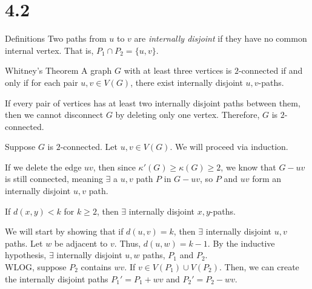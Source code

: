 \documentclass[10pt]{extarticle}
\begin{document}
\section*{4.2}%
\begin{problem}{Definitions}
  Two paths from $u$ to $v$ are \textit{internally disjoint} if they have no common internal vertex. That is, $P_1 \cap P_2 = \{u,v\}$.
  \begin{problem}{Whitney's Theorem}
    A graph $G$ with at least three vertices is $2$-connected if and only if for each pair $u,v\in V(G)$, there exist internally disjoint $u,v$-paths.
    \tcblower
    \begin{description}[font=\normalfont\scshape]
      \item[$(\Leftarrow)$] If every pair of vertices has at least two internally disjoint paths between them, then we cannot disconnect $G$ by deleting only one vertex. Therefore, $G$ is $2$-connected.
      \item[$(\Rightarrow)$] Suppose $G$ is $2$-connected. Let $u,v\in V(G)$. We will proceed via induction.
        \begin{description}[font=\normalfont\scshape]
          \item[Basis: $d(u,v) = 1$:] If we delete the edge $uv$, then since $\kappa'(G) \geq \kappa(G) \geq 2$, we know that $G-uv$ is still connected, meaning $\exists$ a $u,v$ path $P$ in $G - uv$, so $P$ and $uv$ form an internally disjoint $u,v$ path.
          \item[Inductive Hypothesis:] If $d(x,y) < k$ for $k\geq 2$, then $\exists$ internally disjoint $x,y$-paths.
          \item[Proof:] We will start by showing that if $d(u,v) = k$, then $\exists$ internally disjoint $u,v$ paths. Let $w$ be adjacent to $v$. Thus, $d(u,w) = k-1$. By the inductive hypothesis, $\exists$ internally disjoint $u,w$ paths, $P_1$ and $P_2$.\\

            WLOG, suppose $P_2$ contains $wv$. If $v\in V(P_1) \cup V(P_2)$. Then, we can create the internally disjoint paths $P_1' = P_1 + wv$ and $P_2' = P_2 - wv$.\\


\end{description}
\end{description}
\end{problem}
\end{problem}
\end{document}
